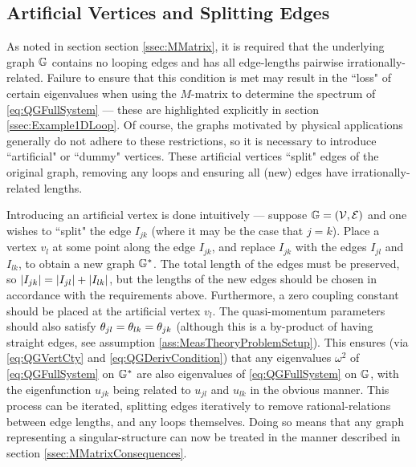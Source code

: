 \subsection{Artificial Vertices and Splitting Edges} \label{ssec:ArtificialVertices}
As noted in section section \ref{ssec:MMatrix}, it is required that the underlying graph $\mathbb{G}$ contains no looping edges and has all edge-lengths pairwise irrationally-related.
Failure to ensure that this condition is met may result in the ``loss" of certain eigenvalues when using the $M$-matrix to determine the spectrum of \eqref{eq:QGFullSystem} --- these are highlighted explicitly in section \ref{ssec:Example1DLoop}.
Of course, the graphs motivated by physical applications generally do not adhere to these restrictions, so it is necessary to introduce ``artificial" or ``dummy" vertices.
These artificial vertices ``split" edges of the original graph, removing any loops and ensuring all (new) edges have irrationally-related lengths.

Introducing an artificial vertex is done intuitively --- suppose $\mathbb{G}=\left( \mathcal{V}, \mathcal{E} \right)$ and one wishes to ``split" the edge $I_{jk}$ (where it may be the case that $j=k$).
Place a vertex $v_l$ at some point along the edge $I_{jk}$, and replace $I_{jk}$ with the edges $I_{jl}$ and $I_{lk}$, to obtain a new graph $\mathbb{G}^*$.
The total length of the edges must be preserved, so $\left\lvert I_{jk} \right\rvert = \left\lvert I_{jl} \right\rvert+\left\lvert I_{lk} \right\rvert$, but the lengths of the new edges should be chosen in accordance with the requirements above.
Furthermore, a zero coupling constant should be placed at the artificial vertex $v_l$.
The quasi-momentum parameters should also satisfy $\theta_{jl}=\theta_{lk}=\theta_{jk}$ (although this is a by-product of having straight edges, see assumption \ref{ass:MeasTheoryProblemSetup}).
This ensures (via \eqref{eq:QGVertCty} and \eqref{eq:QGDerivCondition}) that any eigenvalues $\omega^2$ of \eqref{eq:QGFullSystem} on $\mathbb{G}^*$ are also eigenvalues of \eqref{eq:QGFullSystem} on $\mathbb{G}$, with the eigenfunction $u_{jk}$ being related to $u_{jl}$ and $u_{lk}$ in the obvious manner.
This process can be iterated, splitting edges iteratively to remove rational-relations between edge lengths, and any loops themselves.
Doing so means that any graph representing a singular-structure can now be treated in the manner described in section \ref{ssec:MMatrixConsequences}.


